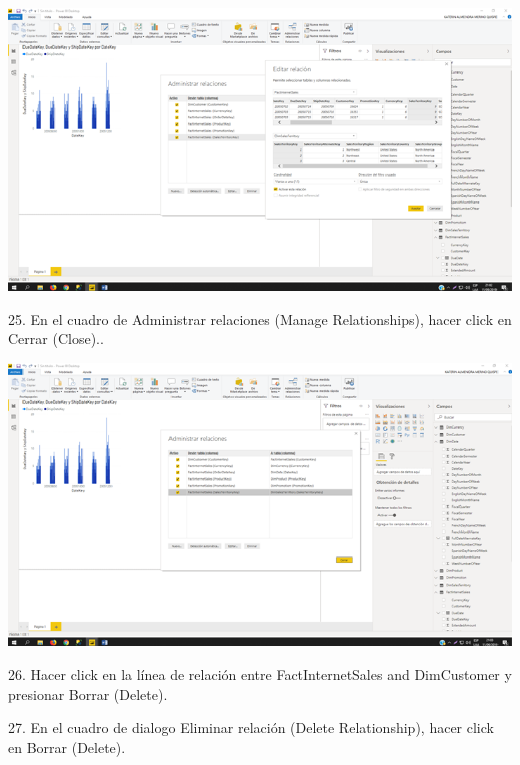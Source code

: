 \begin{center}
\includegraphics[width=15cm]{./Imagenes/img13} 
\end{center}

\item 25. En el cuadro de Administrar relaciones (Manage Relationships), hacer click en Cerrar (Close)..

\begin{center}
\includegraphics[width=15cm]{./Imagenes/img14} 
\end{center}
\item 26. Hacer click en la línea de relación entre FactInternetSales and DimCustomer y presionar Borrar (Delete).
\item 27. En el cuadro de dialogo Eliminar relación (Delete Relationship), hacer click en Borrar (Delete).

